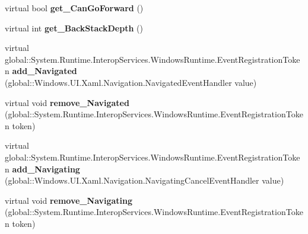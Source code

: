 \begin{DoxyCompactItemize}
\item 
\mbox{\label{class_windows_1_1_u_i_1_1_xaml_1_1_controls_1_1_frame_a85c6c5e01ec4c931d0b6f7752ea62bc4}} 
virtual bool {\bfseries get\+\_\+\+Can\+Go\+Forward} ()
\item 
\mbox{\label{class_windows_1_1_u_i_1_1_xaml_1_1_controls_1_1_frame_ac2a0cbed74e7e3a18163cbcb7a34def2}} 
virtual int {\bfseries get\+\_\+\+Back\+Stack\+Depth} ()
\item 
\mbox{\label{class_windows_1_1_u_i_1_1_xaml_1_1_controls_1_1_frame_a38b94e8bce03524a1c9b3c012074a6e8}} 
virtual global\+::\+System.\+Runtime.\+Interop\+Services.\+Windows\+Runtime.\+Event\+Registration\+Token {\bfseries add\+\_\+\+Navigated} (global\+::\+Windows.\+U\+I.\+Xaml.\+Navigation.\+Navigated\+Event\+Handler value)
\item 
\mbox{\label{class_windows_1_1_u_i_1_1_xaml_1_1_controls_1_1_frame_a6ba58ec5fb87b903e976124fe13e19c0}} 
virtual void {\bfseries remove\+\_\+\+Navigated} (global\+::\+System.\+Runtime.\+Interop\+Services.\+Windows\+Runtime.\+Event\+Registration\+Token token)
\item 
\mbox{\label{class_windows_1_1_u_i_1_1_xaml_1_1_controls_1_1_frame_afe49379e4ea3f7d217517f9ee7ba2bf9}} 
virtual global\+::\+System.\+Runtime.\+Interop\+Services.\+Windows\+Runtime.\+Event\+Registration\+Token {\bfseries add\+\_\+\+Navigating} (global\+::\+Windows.\+U\+I.\+Xaml.\+Navigation.\+Navigating\+Cancel\+Event\+Handler value)
\item 
\mbox{\label{class_windows_1_1_u_i_1_1_xaml_1_1_controls_1_1_frame_acc34f8b3bc84d17cad43aca5bcf5e0d4}} 
virtual void {\bfseries remove\+\_\+\+Navigating} (global\+::\+System.\+Runtime.\+Interop\+Services.\+Windows\+Runtime.\+Event\+Registration\+Token token)
\item 
\mbox{\label{class_windows_1_1_u_i_1_1_xaml_1_1_controls_1_1_frame_aa26741405bfc110f4b1b1905879092fd}} 

\end{DoxyCompactItemize}
